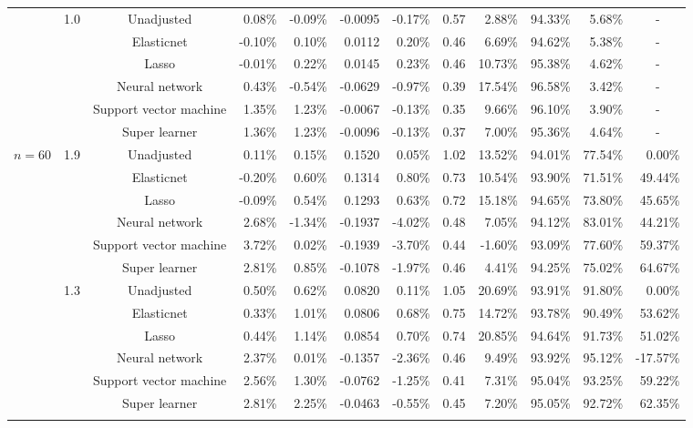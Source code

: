 \documentclass{article}
\begin{document}
\begin{center}
\begin{table}[!ht]
\begin{tabular*}{\textwidth}{@{\extracolsep\fill}c|c|c|rrrr|rrrrr}
        ~ & \multirow{6}{*}{1.0} & Unadjusted & 0.08\% & -0.09\% & -0.0095 & -0.17\% & 0.57 & 2.88\% & 94.33\% & 5.68\% & \multicolumn{1}{c}{-} \\ 
        ~ & ~ & Elasticnet & -0.10\% & 0.10\% & 0.0112 & 0.20\% & 0.46 & 6.69\% & 94.62\% & 5.38\% & \multicolumn{1}{c}{-} \\ 
        ~ & ~ & Lasso & -0.01\% & 0.22\% & 0.0145 & 0.23\% & 0.46 & 10.73\% & 95.38\% & 4.62\% & \multicolumn{1}{c}{-} \\ 
        ~ & ~ & Neural network & 0.43\% & -0.54\% & -0.0629 & -0.97\% & 0.39 & 17.54\% & 96.58\% & 3.42\% & \multicolumn{1}{c}{-} \\ 
        ~ & ~ & Support vector machine & 1.35\% & 1.23\% & -0.0067 & -0.13\% & 0.35 & 9.66\% & 96.10\% & 3.90\% & \multicolumn{1}{c}{-} \\ 
        ~ & ~ & Super learner & 1.36\% & 1.23\% & -0.0096 & -0.13\% & 0.37 & 7.00\% & 95.36\% & 4.64\% & \multicolumn{1}{c}{-} \\    \hline
        
        
         \multirow{18}{*}{$n = 60$} & \multirow{6}{*}{1.9} & Unadjusted & 0.11\% & 0.15\% & 0.1520 & 0.05\% & 1.02 & 13.52\% & 94.01\% & 77.54\% & 0.00\% \\ 
        ~ & ~ & Elasticnet & -0.20\% & 0.60\% & 0.1314 & 0.80\% & 0.73 & 10.54\% & 93.90\% & 71.51\% & 49.44\% \\ 
        ~ & ~ & Lasso & -0.09\% & 0.54\% & 0.1293 & 0.63\% & 0.72 & 15.18\% & 94.65\% & 73.80\% & 45.65\% \\ 
        ~ & ~ & Neural network & 2.68\% & -1.34\% & -0.1937 & -4.02\% & 0.48 & 7.05\% & 94.12\% & 83.01\% & 44.21\% \\ 
        ~ & ~ & Support vector machine & 3.72\% & 0.02\% & -0.1939 & -3.70\% & 0.44 & -1.60\% & 93.09\% & 77.60\% & 59.37\% \\ 
        ~ & ~ & Super learner & 2.81\% & 0.85\% & -0.1078 & -1.97\% & 0.46 & 4.41\% & 94.25\% & 75.02\% & 64.67\% \\  \cline{2-12}
        
        ~ & \multirow{6}{*}{1.3} & Unadjusted & 0.50\% & 0.62\% & 0.0820 & 0.11\% & 1.05 & 20.69\% & 93.91\% & 91.80\% & 0.00\% \\ 
        ~ & ~ & Elasticnet & 0.33\% & 1.01\% & 0.0806 & 0.68\% & 0.75 & 14.72\% & 93.78\% & 90.49\% & 53.62\% \\ 
        ~ & ~ & Lasso & 0.44\% & 1.14\% & 0.0854 & 0.70\% & 0.74 & 20.85\% & 94.64\% & 91.73\% & 51.02\% \\ 
        ~ & ~ & Neural network & 2.37\% & 0.01\% & -0.1357 & -2.36\% & 0.46 & 9.49\% & 93.92\% & 95.12\% & -17.57\% \\ 
        ~ & ~ & Support vector machine & 2.56\% & 1.30\% & -0.0762 & -1.25\% & 0.41 & 7.31\% & 95.04\% & 93.25\% & 59.22\% \\ 
        ~ & ~ & Super learner & 2.81\% & 2.25\% & -0.0463 & -0.55\% & 0.45 & 7.20\% & 95.05\% & 92.72\% & 62.35\% \\   \cline{2-12}
        

\end{tabular*}
\end{table}
\end{center}
\end{document}
